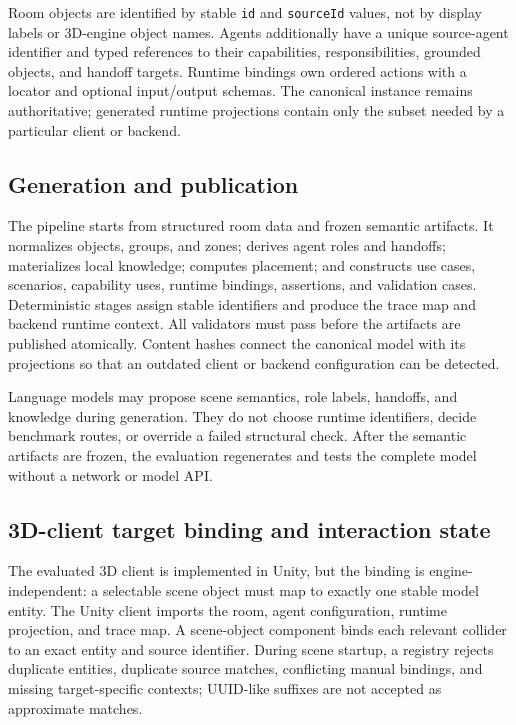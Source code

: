 Room objects are identified by stable \texttt{id} and \texttt{sourceId} values,
not by display labels or 3D-engine object names.  Agents additionally have a
unique source-agent identifier and typed references to their capabilities,
responsibilities, grounded objects, and handoff targets.  Runtime bindings own
ordered actions with a locator and optional input/output schemas.  The canonical
instance remains authoritative; generated runtime projections contain only the
subset needed by a particular client or backend.

\subsection{Generation and publication}

The pipeline starts from structured room data and frozen semantic artifacts.  It
normalizes objects, groups, and zones; derives agent roles and handoffs;
materializes local knowledge; computes placement; and constructs use cases,
scenarios, capability uses, runtime bindings, assertions, and validation cases.
Deterministic stages assign stable identifiers and produce the trace map and
backend runtime context.  All validators must pass before the artifacts are
published atomically.  Content hashes connect the canonical model with its
projections so that an outdated client or backend configuration can be detected.

Language models may propose scene semantics, role labels, handoffs, and
knowledge during generation.  They do not choose runtime identifiers, decide
benchmark routes, or override a failed structural check.  After the semantic
artifacts are frozen, the evaluation regenerates and tests the complete model
without a network or model API.

\subsection{3D-client target binding and interaction state}

The evaluated 3D client is implemented in Unity, but the binding is
engine-independent: a selectable scene object must map to exactly one stable
model entity.  The Unity client imports the room, agent configuration, runtime
projection, and trace map.  A scene-object component binds each relevant
collider to an exact entity and source identifier.  During scene startup, a
registry rejects duplicate entities, duplicate source matches, conflicting
manual bindings, and missing target-specific contexts; UUID-like suffixes are
not accepted as approximate matches.

